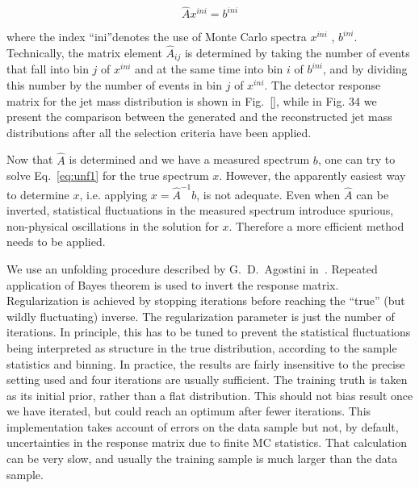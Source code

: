 \begin{equation}
\hat{A} x^{ini} = b^{ini}
\end{equation}


\noindent where the index ``ini''denotes the use of Monte Carlo spectra $x^{ini}$ , $b^{ini}$. Technically, the matrix element $\hat{A}_{ij}$ is determined by taking the number of events that fall into bin $j$ of $x^{ini}$ and at the same time into bin $i$ of $b^{ini}$, and by dividing this number by the number of events in bin $j$ of $x^{ini}$. The detector response matrix for the jet mass distribution is shown in Fig.~\ref{}, while in Fig. 34 we present the comparison between the generated  and the reconstructed jet mass distributions after all the selection criteria have been applied.

Now that $\hat{A}$ is determined and we have a measured spectrum $b$, one can try to solve Eq.~\ref{eq:unf1} for the true spectrum $x$. However, the apparently easiest way to determine $x$, i.e. applying $x = \hat{A}^{-1}b$, is not adequate. Even when $\hat{A}$ can be inverted, statistical fluctuations in the measured spectrum introduce spurious, non-physical oscillations in the solution for $x$. Therefore a more efficient method needs to be applied. 

We use an unfolding procedure described by G.~D.~Agostini in~\cite{agostini}. Repeated application of Bayes theorem is used to invert the response matrix. Regularization is achieved by stopping iterations before reaching the ``true'' (but wildly fluctuating) inverse. The regularization parameter is just the number of iterations.
 In principle, this has to be tuned to prevent the statistical fluctuations being interpreted as structure in the true distribution, according to the sample statistics and binning. In practice, the results are fairly insensitive to the precise setting used and four iterations are usually sufficient.
The training truth is taken as its initial prior, rather than a flat distribution. This should not bias result once we have iterated, but could reach an optimum after fewer iterations.
This implementation takes account of errors on the data sample but not, by default, uncertainties in the response matrix due to finite MC statistics. That calculation can be very slow, and usually the training sample is much larger than the data sample.


